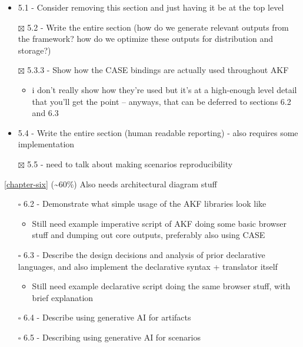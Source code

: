\begin{itemize}
\tightlist
\item
  5.1 - Consider removing this section and just having it be at the top
  level
\item[$\boxtimes$]
  5.2 - Write the entire section (how do we generate relevant outputs
  from the framework? how do we optimize these outputs for distribution
  and storage?)
\item[$\boxtimes$]
  5.3.3 - Show how the CASE bindings are actually used throughout AKF

  \begin{itemize}
  \tightlist
  \item
    i don't really show how they're used but it's at a high-enough level
    detail that you'll get the point -- anyways, that can be deferred to
    sections 6.2 and 6.3
  \end{itemize}
\item
  5.4 - Write the entire section (human readable reporting) - also
  requires some implementation
\item[$\boxtimes$]
  5.5 - need to talk about making scenarios reproducibility
\end{itemize}

\autoref{chapter-six} (\textasciitilde60\%) Also needs
architectural diagram stuff

\begin{itemize}
\tightlist
\item[$\square$]
  6.2 - Demonstrate what simple usage of the AKF libraries look like

  \begin{itemize}
  \tightlist
  \item
    Still need example imperative script of AKF doing some basic browser
    stuff and dumping out core outputs, preferably also using CASE
  \end{itemize}
\item[$\square$]
  6.3 - Describe the design decisions and analysis of prior declarative
  languages, and also implement the declarative syntax + translator
  itself

  \begin{itemize}
  \tightlist
  \item
    Still need example declarative script doing the same browser stuff,
    with brief explanation
  \end{itemize}
\item[$\square$]
  6.4 - Describe using generative AI for artifacts
\item[$\square$]
  6.5 - Describing using generative AI for scenarios
\end{itemize}


